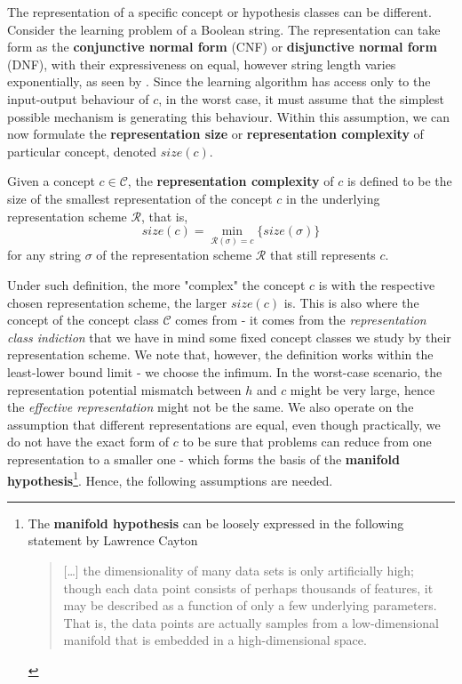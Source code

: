 \documentclass[10pt]{article} %
\begin{document}
The representation of a specific concept or hypothesis classes can be different. Consider the learning problem of a Boolean string. The representation can take form as the \textbf{conjunctive normal form} (CNF) or \textbf{disjunctive normal form} (DNF), with their expressiveness on equal, however string length varies exponentially, as seen by \cite{Wegener1987,MiltersenRadhakrishnanWegener2005,DarwicheMarquis2002}. Since the learning algorithm has access only to the input-output behaviour of $c$, in the worst case, it must assume that the simplest possible mechanism is generating this behaviour. Within this assumption, we can now formulate the \textbf{representation size} or \textbf{representation complexity} of particular concept, denoted $size(c)$. 
\begin{definition}
    Given a concept $c\in\mathcal{C}$, the \textbf{representation complexity} of $c$ is defined to be the size of the smallest representation of the concept $c$ in the underlying representation scheme $\mathcal{R}$, that is, 
    \begin{equation*}
    size(c) = \min_{\mathcal{R}(\sigma)=c}\{size(\sigma)\}
\end{equation*}
for any string $\sigma$ of the representation scheme $\mathcal{R}$ that still represents $c$.
\end{definition}
Under such definition, the more "complex" the concept $c$ is with the respective chosen representation scheme, the larger $size(c)$ is. This is also where the concept of the concept class $\mathcal{C}$ comes from - it comes from the \textit{representation class indiction} that we have in mind some fixed concept classes we study by their representation scheme. We note that, however, the definition works within the least-lower bound limit - we choose the infimum. In the worst-case scenario, the representation potential mismatch between $h$ and $c$ might be very large, hence the \textit{effective representation} might not be the same. We also operate on the assumption that different representations are equal, even though practically, we do not have the exact form of $c$ to be sure that problems can reduce from one representation to a smaller one - which forms the basis of the \textbf{manifold hypothesis}\footnote{The \textbf{manifold hypothesis} can be loosely expressed in the following statement by Lawrence Cayton \begin{quote}
  [\dots] the dimensionality of many data sets is only artificially high; though each data point consists of perhaps thousands of features, it may be described as a function of only a few underlying parameters. That is, the data points are actually samples from a low-dimensional manifold that is embedded in a high-dimensional space. 
\end{quote}}. Hence, the following assumptions are needed. 
\end{document}
